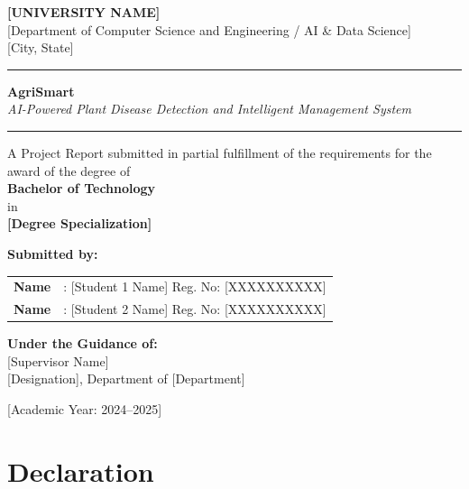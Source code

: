 \documentclass[12pt,a4paper]{report}
\begin{document}
\begin{titlepage}
\centering
\vspace*{0.3in}

{\Large \textbf{[UNIVERSITY NAME]}}\\[4pt]
{\normalsize [Department of Computer Science and Engineering / AI \& Data Science]}\\[4pt]
{\normalsize [City, State]}

\vspace{0.4in}
\rule{\linewidth}{0.4pt}

\vspace{0.3in}
{\LARGE \textbf{AgriSmart}}\\[8pt]
{\large \textit{AI-Powered Plant Disease Detection and Intelligent Management System}}

\vspace{0.3in}
\rule{\linewidth}{0.4pt}

\vspace{0.2in}
{\normalsize A Project Report submitted in partial fulfillment of the requirements for the award of the degree of}\\[6pt]
{\large \textbf{Bachelor of Technology}}\\[4pt]
{\normalsize in}\\[4pt]
{\large \textbf{[Degree Specialization]}}

\vspace{0.4in}
{\normalsize \textbf{Submitted by:}}\\[6pt]
\begin{tabular}{ll}
\textbf{Name} & : [Student 1 Name] \quad Reg. No: [XXXXXXXXXX] \\[4pt]
\textbf{Name} & : [Student 2 Name] \quad Reg. No: [XXXXXXXXXX] \\
\end{tabular}

\vspace{0.4in}
{\normalsize \textbf{Under the Guidance of:}}\\[6pt]
{\normalsize [Supervisor Name]}\\
{\normalsize [Designation], Department of [Department]}

\vfill
{\normalsize [Academic Year: 2024--2025]}
\end{titlepage}

\chapter*{Declaration}
\thispagestyle{plain}
\end{document}
